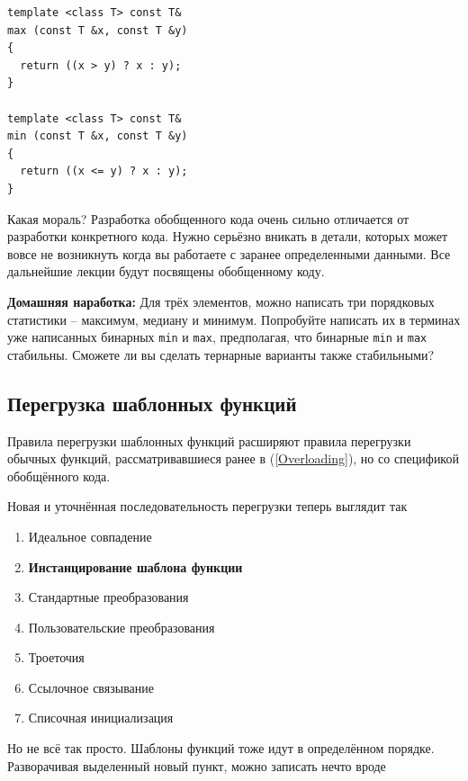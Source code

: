 \documentclass[a4paper,12pt,oneside]{book}
\begin{document}
\begin{lstlisting}
template <class T> const T&
max (const T &x, const T &y)
{
  return ((x > y) ? x : y);
}

template <class T> const T&
min (const T &x, const T &y)
{
  return ((x <= y) ? x : y);
}
\end{lstlisting}
\fi

Какая мораль? Разработка обобщенного кода очень сильно отличается от разработки конкретного кода. Нужно серьёзно вникать в детали, которых может вовсе не возникнуть когда вы работаете с заранее определенными данными. Все дальнейшие лекции будут посвящены обобщенному коду. 

\textbf{Домашняя наработка:} Для трёх элементов, можно написать три порядковых статистики -- максимум, медиану и минимум. Попробуйте написать их в терминах уже написанных бинарных \lstinline!min! и \lstinline!max!, предполагая, что бинарные \lstinline!min! и \lstinline!max! стабильны. Сможете ли вы сделать тернарные варианты также стабильными?

\subsection{Перегрузка шаблонных функций}\label{TemplOverloading}

Правила перегрузки шаблонных функций расширяют правила перегрузки обычных функций, рассматривавшиеся ранее в (\ref{Overloading}), но со спецификой обобщённого кода. 

Новая и уточнённая последовательность перегрузки теперь выглядит так

\begin{enumerate}
\item Идеальное совпадение
\item \textbf{Инстанцирование шаблона функции}
\item Стандартные преобразования
\item Пользовательские преобразования
\item Троеточия
\item Ссылочное связывание
\item Списочная инициализация
\end{enumerate}

Но не всё так просто. Шаблоны функций тоже идут в определённом порядке. Разворачивая выделенный новый пункт, можно записать нечто вроде
\end{document}

